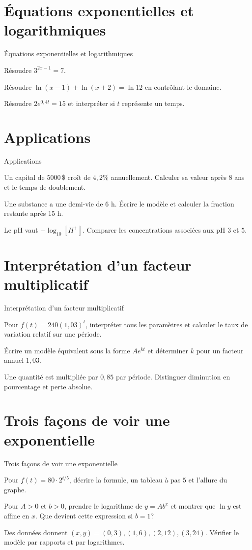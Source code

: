 \section{Équations exponentielles et logarithmiques}
\label{workbook:section:06.04}
\begin{exerciseblock}{Équations exponentielles et logarithmiques}
\item Résoudre $3^{2x-1}=7$.
\item Résoudre $\ln(x-1)+\ln(x+2)=\ln 12$ en contrôlant le domaine.
\item Résoudre $2e^{0{,}4t}=15$ et interpréter si $t$ représente un temps.
\end{exerciseblock}
\section{Applications}
\label{workbook:section:06.05}
\begin{exerciseblock}{Applications}
\item Un capital de $5000\,$\$ croît de $4{,}2\%$ annuellement. Calculer sa valeur après $8$ ans et le temps de doublement.
\item Une substance a une demi-vie de $6$ h. Écrire le modèle et calculer la fraction restante après $15$ h.
\item Le pH vaut $-\log_{10}[H^+]$. Comparer les concentrations associées aux pH $3$ et $5$.
\end{exerciseblock}
\section{Interprétation d'un facteur multiplicatif}
\label{workbook:section:06.06}
\begin{exerciseblock}{Interprétation d'un facteur multiplicatif}
\item Pour $f(t)=240(1{,}03)^t$, interpréter tous les paramètres et calculer le taux de variation relatif sur une période.
\item Écrire un modèle équivalent sous la forme $Ae^{kt}$ et déterminer $k$ pour un facteur annuel $1{,}03$.
\item Une quantité est multipliée par $0{,}85$ par période. Distinguer diminution en pourcentage et perte absolue.
\end{exerciseblock}
\section{Trois façons de voir une exponentielle}
\label{workbook:section:06.07}
\begin{exerciseblock}{Trois façons de voir une exponentielle}
\item Pour $f(t)=80\cdot2^{t/5}$, décrire la formule, un tableau à pas $5$ et l'allure du graphe.
\item Pour $A>0$ et $b>0$, prendre le logarithme de $y=Ab^x$ et montrer que $\ln y$ est affine en $x$. Que devient cette expression si $b=1$?
\item Des données donnent $(x,y)=(0,3),(1,6),(2,12),(3,24)$. Vérifier le modèle par rapports et par logarithmes.
\end{exerciseblock}
